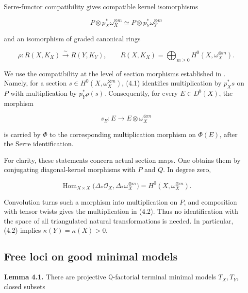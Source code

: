 \documentclass[11pt,a4paper]{article}
\begin{document}
Serre-functor compatibility gives compatible kernel isomorphisms

\begin{equation*}
P\otimes p_X^*\omega_X^{\otimes m}
\simeq
P\otimes p_Y^*\omega_Y^{\otimes m}
\tag{4.1}
\end{equation*}

and an isomorphism of graded canonical rings

\begin{equation*}
\rho:R(X,K_X)\xrightarrow{\sim}R(Y,K_Y),
\qquad
R(X,K_X)=\bigoplus_{m\geq0}H^0(X,\omega_X^{\otimes m}).
\tag{4.2}
\end{equation*}

We use the compatibility at the level of section morphisms established in \cite[Proposition 4.1, Lemmas 4.2--4.3, and Corollary 4.4]{Tod06}. Namely, for a section $s\in H^0(X,\omega_X^{\otimes m})$, (4.1) identifies multiplication by $p_X^*s$ on $P$ with multiplication by $p_Y^*\rho(s)$. Consequently, for every $E\in D^b(X)$, the morphism

\begin{equation*}
s_E:E\longrightarrow E\otimes\omega_X^{\otimes m}
\tag{4.3}
\end{equation*}

is carried by $\Phi$ to the corresponding multiplication morphism on $\Phi(E)$, after the Serre identification.

For clarity, these statements concern actual section maps. One obtains them by conjugating diagonal-kernel morphisms with $P$ and $Q$. In degree zero,

\begin{equation*}
\operatorname{Hom}_{X\times X}
\bigl(\Delta_*\mathcal O_X,\Delta_*\omega_X^{\otimes m}\bigr)
=H^0(X,\omega_X^{\otimes m}).
\end{equation*}

Convolution turns such a morphism into multiplication on $P$, and composition with tensor twists gives the multiplication in (4.2). Thus no identification with the space of all triangulated natural transformations is needed. In particular, (4.2) implies $\kappa(Y)=\kappa(X)>0$.

\subsection{Free loci on good minimal models}

\noindent \textbf{Lemma 4.1.} There are projective $\mathbb Q$-factorial terminal minimal models $T_X,T_Y$, closed subsets
\end{document}

